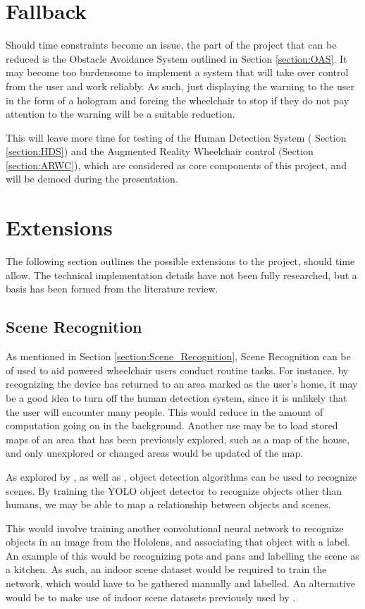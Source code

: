 \documentclass[12pt,a4paper]{report}
\begin{document}
\section{Fallback}
Should time constraints become an issue, the part of the project that can be reduced is the Obstacle Avoidance System outlined in Section \ref{section:OAS}. It may become too burdensome to implement a system that will take over control from the user and work reliably. As such, just displaying the warning to the user in the form of a hologram and forcing the wheelchair to stop if they do not pay attention to the warning will be a suitable reduction.

This will leave more time for testing of the Human Detection System ( Section \ref{section:HDS}) and the Augmented Reality Wheelchair control (Section \ref{section:ARWC}), which are considered as core components of this project, and will be demoed during the presentation.

\section{Extensions}
The following section outlines the possible extensions to the project, should time allow. The technical implementation details have not been fully researched, but a basis has been formed from the literature review.

\subsection{Scene Recognition}
As mentioned in Section \ref{section:Scene_Recognition}, Scene Recognition can be of used to aid powered wheelchair users conduct routine tasks. For instance, by recognizing the device has returned to an area marked as the user's home, it may be a good idea to turn off the human detection system, since it is unlikely that the user will encounter many people. This would reduce in the amount of computation going on in the background. Another use may be to load stored maps of an area that has been previously explored, such as a map of the house, and only unexplored or changed areas would be updated of the map.

As explored by \cite{Quattoni2009}, as well as \cite{Espinace2010}, object detection algorithms can be used to recognize scenes. By training the YOLO object detector to recognize objects other than humans, we may be able to map a relationship between objects and scenes.

This would involve training another convolutional neural network to recognize objects in an image from the Hololens, and associating that object with a label. An example of this would be recognizing pots and pans and labelling the scene as a kitchen. As such, an indoor scene dataset would be required to train the network, which would have to be gathered manually and labelled. An alternative would be to make use of indoor scene datasets previously used by \cite{Quattoni2009}.
\end{document}
